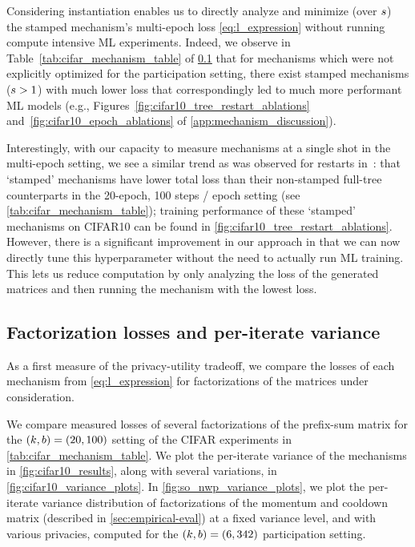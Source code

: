 \documentclass{article} %
\theoremstyle{named}
\begin{document}

Considering instantiation enables us to directly analyze and minimize (over $s$) the stamped mechanism's multi-epoch loss \cref{eq:l_expression} without running compute intensive ML experiments. Indeed, we observe in Table~\ref{tab:cifar_mechanism_table} of \cref{app:ssec:losses} that for mechanisms which were not explicitly optimized for the \multiepoch participation setting, there exist stamped mechanisms ($s>1$) with much lower loss that correspondingly led to much more performant ML models (e.g., Figures~\ref{fig:cifar10_tree_restart_ablations} and~\ref{fig:cifar10_epoch_ablations} of \cref{app:mechanism_discussion}).

Interestingly, with our capacity to measure mechanisms at a single shot in the multi-epoch setting, we see a similar trend as was observed for restarts in~\citet{kairouz2021practical}: that `stamped' mechanisms have lower total loss than their non-stamped full-tree counterparts in the 20-epoch, 100 steps / epoch setting (see \cref{tab:cifar_mechanism_table}); training performance of these `stamped' mechanisms on CIFAR10 can be found in \cref{fig:cifar10_tree_restart_ablations}. However, there is a significant improvement in our approach in that we can now directly tune this hyperparameter without the need to actually run ML training. This lets us reduce computation by only analyzing the loss of the generated matrices and then running the mechanism with the lowest loss.

\subsection{Factorization losses and per-iterate variance}\label{app:ssec:losses} 
As a first measure of the privacy-utility tradeoff, we compare the losses of each mechanism from \cref{eq:l_expression} for factorizations of the matrices under consideration.

We compare measured losses of several factorizations of the prefix-sum matrix for the $(k,b)=(20, 100)$ setting of the CIFAR experiments in \cref{tab:cifar_mechanism_table}. We plot the per-iterate variance of the mechanisms in \cref{fig:cifar10_results}, along with several variations, in \cref{fig:cifar10_variance_plots}. 
In \cref{fig:so_nwp_variance_plots}, we plot the per-iterate variance distribution of factorizations of the momentum and cooldown matrix (described in \cref{sec:empirical-eval}) at a fixed variance level, and with various privacies, computed for the $(k,b)=(6,342)$ participation setting.
\end{document}
